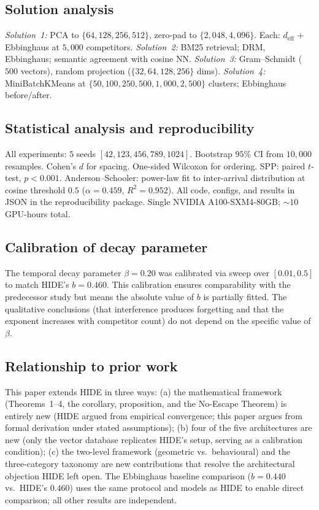 \documentclass[11pt]{article}
\begin{document}
\subsection*{Solution analysis}

\textit{Solution~1:} PCA to $\{64, 128, 256, 512\}$, zero-pad to $\{2{,}048, 4{,}096\}$. Each: $d_\text{eff}$ $+$ Ebbinghaus at $5{,}000$ competitors. \textit{Solution~2:} BM25 retrieval; DRM, Ebbinghaus; semantic agreement with cosine NN. \textit{Solution~3:} Gram--Schmidt ($500$ vectors), random projection ($\{32, 64, 128, 256\}$ dims). \textit{Solution~4:} MiniBatchKMeans at $\{50, 100, 250, 500, 1{,}000, 2{,}500\}$ clusters; Ebbinghaus before/after.

\subsection*{Statistical analysis and reproducibility}

All experiments: $5$ seeds $[42, 123, 456, 789, 1024]$. Bootstrap $95\%$ CI from $10{,}000$ resamples. Cohen's $d$ for spacing. One-sided Wilcoxon for ordering. SPP: paired $t$-test, $p < 0.001$. Anderson--Schooler: power-law fit to inter-arrival distribution at cosine threshold $0.5$ ($\alpha = 0.459$, $R^2 = 0.952$). All code, configs, and results in JSON in the reproducibility package. Single NVIDIA A100-SXM4-80GB; ${\sim}10$ GPU-hours total.

\subsection*{Calibration of decay parameter}
\noindent The temporal decay parameter $\beta = 0.20$ was calibrated via sweep over $[0.01, 0.5]$ to match HIDE's $b = 0.460$. This calibration ensures comparability with the predecessor study but means the absolute value of $b$ is partially fitted. The qualitative conclusions (that interference produces forgetting and that the exponent increases with competitor count) do not depend on the specific value of $\beta$.

\subsection*{Relationship to prior work}
\noindent This paper extends HIDE\cite{gopinath2025} in three ways: (a) the mathematical framework (Theorems~1--4, the corollary, proposition, and the No-Escape Theorem) is entirely new (HIDE argued from empirical convergence; this paper argues from formal derivation under stated assumptions); (b) four of the five architectures are new (only the vector database replicates HIDE's setup, serving as a calibration condition); (c) the two-level framework (geometric vs.\ behavioural) and the three-category taxonomy are new contributions that resolve the architectural objection HIDE left open. The Ebbinghaus baseline comparison ($b = 0.440$ vs.\ HIDE's $0.460$) uses the same protocol and models as HIDE to enable direct comparison; all other results are independent.
\end{document}
